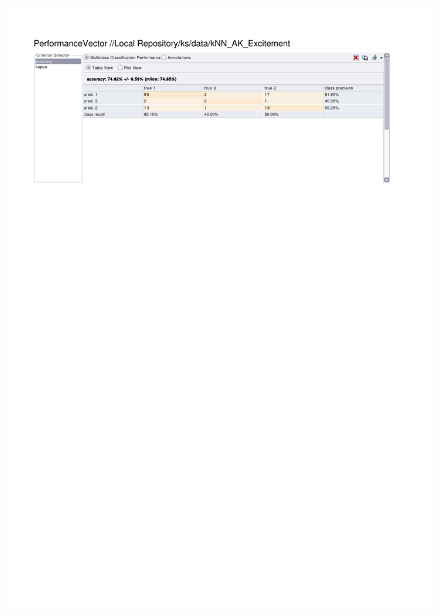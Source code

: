 \begin{figure}[htp]
  \centerline{\includegraphics[trim=0 680 0 60,clip,width=16.09cm]{results/kNN_A_Excitement.pdf}} \caption{
} \label{kNN_K_Excitement}
\end{figure}


